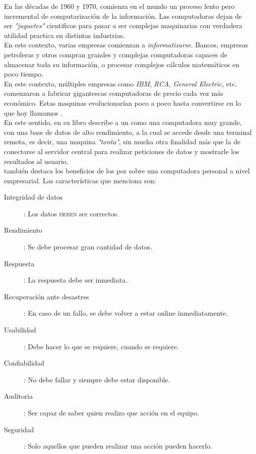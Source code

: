 En las décadas de 1960 y 1970, comienza en el mundo un proceso lento pero incremental de
computarización de la información. Las computadoras dejan de ser \emph{"juguetes"}
cientificos para pasar a ser complejas maquinarias con verdadera utilidad practica
en distintas industrias.\\
En este contexto, varias empresas comienzan a \emph{informatizarse}. Bancos, empresas
petroleras y otros compran grandes y complejas computadoras capaces de almacenar toda
su información, o procesar complejos cálculos matemáticos en poco tiempo.\\
En este contexto, múltiples empresas como \emph{IBM}, \emph{RCA}, \emph{General Electric},
etc. comenzaron a fabricar gigantescas computadoras de precio cada vez más económico.
Estas maquinas evolucionarían poco a poco hasta convertirse en lo que hoy llamamos
\mainframes.\\
En este sentido,  en su libro
  describe a un \mainframe como
una computadora muy grande, con una base de datos de alto rendimiento, a la cual se accede
desde una terminal remota, es decir, una maquina \emph{"tonta"}, sin mucha otra finalidad
más que la de conectarse al servidor central para realizar peticiones de datos y mostrarle
los resultados al usuario.\\
\citeauthor{Stephens:2008:BOOK} también destaca los beneficios de los \mainframes por sobre
una computadora personal a nivel empresarial. Las características que menciona son:
\begin{description}
	\item[Integridad de datos]: Los datos \textsc{deben} ser correctos.
	\item[Rendimiento]: Se debe procesar gran cantidad de datos.
	\item[Respuesta]: La respuesta debe ser inmediata.
	\item[Recuperación ante desastres]: En caso de un fallo, se debe volver a estar online
		inmediatamente.
	\item[Usabilidad]: Debe hacer lo que se requiere, cuando se requiere.
	\item[Confiabilidad]: No debe fallar y siempre debe estar disponible.
	\item[Auditoria]: Ser capaz de saber quien realizo que acción en el equipo.
	\item[Seguridad]: Solo aquellos que pueden realizar una acción pueden hacerlo.
\end{description}
